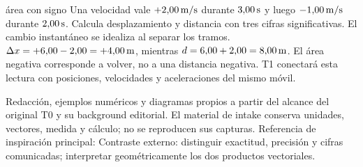 \documentclass[11pt,a4paper]{article}
\begin{document}
\begin{exercisebox}{\'area con signo}
Una velocidad vale $+2{,}00\,\mathrm{m/s}$ durante $3{,}00\,\mathrm{s}$ y luego
$-1{,}00\,\mathrm{m/s}$ durante $2{,}00\,\mathrm{s}$. Calcula desplazamiento y distancia con tres
cifras significativas. El cambio instant\'aneo se idealiza al separar los tramos.
\solutionblock
$\Delta x=+6{,}00-2{,}00=+4{,}00\,\mathrm{m}$, mientras $d=6{,}00+2{,}00=8{,}00\,\mathrm{m}$.
El \'area negativa corresponde a volver, no a una distancia negativa.
T1 conectar\'a esta lectura con posiciones, velocidades y aceleraciones del mismo m\'ovil.
\end{exercisebox}

Redacci\'on, ejemplos num\'ericos y diagramas propios a partir del alcance del
original T0 y su background editorial. El material de intake conserva unidades,
vectores, medida y c\'alculo; no se reproducen sus capturas.
Referencia de inspiraci\'on principal:
Contraste externo: distinguir exactitud, precisi\'on y cifras comunicadas; interpretar
geom\'etricamente los dos productos vectoriales.
\end{document}
